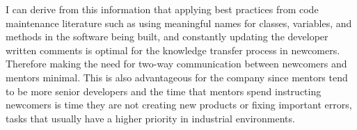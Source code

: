 \documentclass[12pt, letterpaper]{article}
\begin{document}
I can derive from this information that applying best practices from code maintenance literature such as 
using meaningful names for classes, variables, and methods in the software being built, and constantly updating
the developer written comments is optimal for the knowledge transfer process in newcomers. Therefore making
the need for two-way communication between newcomers and mentors minimal. This is also advantageous for the
company since mentors tend to be more senior developers and the time that mentors spend instructing newcomers
is time they are not creating new products or fixing important errors, tasks that usually have a higher priority
in industrial environments.



 
\end{document}

